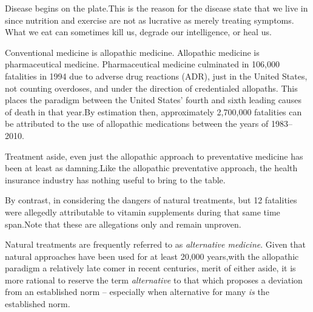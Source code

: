 
Disease begins on the plate. This is the reason for the disease state that we live in since nutrition and exercise are not as lucrative as merely treating symptoms. What we eat can sometimes kill us,
degrade our intelligence,
or heal us.
\footnotecite[cavusoglu2009]

Conventional medicine is allopathic medicine. Allopathic medicine is pharmaceutical medicine. Pharmaceutical medicine culminated in 106,000 fatalities in 1994 due to adverse drug reactions (ADR), just in the United States, not counting overdoses, and under the direction of credentialed allopaths. This places the paradigm between the United States' fourth and sixth leading causes of death in that year. By estimation then, approximately 2,700,000 fatalities can be attributed to the use of allopathic medications between the years of 1983--2010.\footnotecite[leape2000] 

Treatment aside, even just the allopathic approach to preventative medicine has been at least as damning. Like the allopathic preventative approach, the health insurance industry has nothing useful to bring to the table.

By contrast, in considering the dangers of natural treatments, but 12 fatalities were allegedly attributable to vitamin supplements during that same time span. Note that these are allegations only and remain unproven. 

Natural treatments are frequently referred to as {\it alternative medicine}. Given that natural approaches have been used for at least 20,000 years,\footnotecite[hardy2012] with the allopathic paradigm a relatively late comer in recent centuries, merit of either aside, it is more rational to reserve the term {\it alternative} to that which proposes a deviation from an established norm -- especially when alternative for many {\it is} the established norm.

